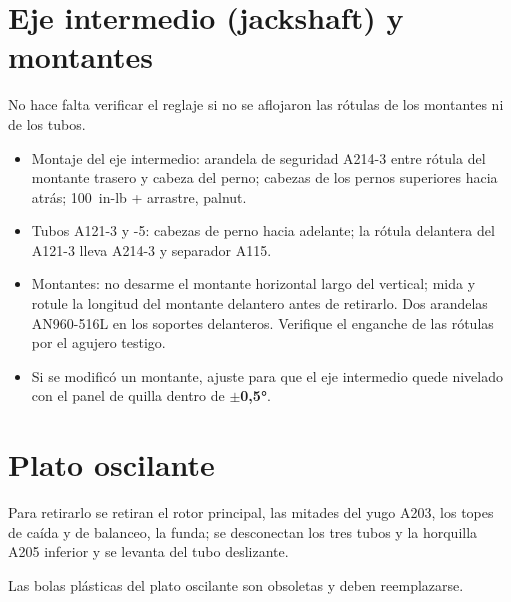 \section{Eje intermedio (jackshaft) y montantes}

No hace falta verificar el reglaje si no se aflojaron las rótulas de los montantes ni de los tubos.

\begin{itemize}
\item Montaje del eje intermedio: arandela de seguridad A214-3 entre rótula del montante trasero y cabeza del perno; cabezas de los pernos superiores hacia atrás; 100~in-lb + arrastre, palnut.
\item Tubos A121-3 y -5: cabezas de perno hacia adelante; la rótula delantera del A121-3 lleva A214-3 y separador A115.
\item Montantes: no desarme el montante horizontal largo del vertical; mida y rotule la longitud del montante delantero antes de retirarlo. Dos arandelas AN960-516L en los soportes delanteros. Verifique el enganche de las rótulas por el agujero testigo.
\item Si se modificó un montante, ajuste para que el eje intermedio quede nivelado con el panel de quilla dentro de \textbf{$\pm$0,5°}.
\end{itemize}

\section{Plato oscilante}

Para retirarlo se retiran el rotor principal, las mitades del yugo A203, los topes de caída y de balanceo, la funda; se desconectan los tres tubos y la horquilla A205 inferior y se levanta del tubo deslizante.

\begin{precaucion}
Las bolas plásticas del plato oscilante son obsoletas y deben reemplazarse.
\end{precaucion}


